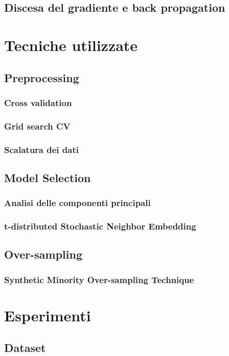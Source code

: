 \documentclass[12pt, twoside, letterpaper]{report}
\begin{document}
		
		\section{Discesa del gradiente e back propagation}
		
	\chapter{Tecniche utilizzate}
		\section{Preprocessing}
			\subsection{Cross validation}
			\subsection{Grid search CV}
			\subsection{Scalatura dei dati}
		\section{Model Selection}			
			\subsection{Analisi delle componenti principali}
			\subsection{t-distributed Stochastic Neighbor Embedding}
		\section{Over-sampling}
			\subsection{Synthetic Minority Over-sampling Technique}
		
	\chapter{Esperimenti}
		\section{Dataset}
\end{document}
